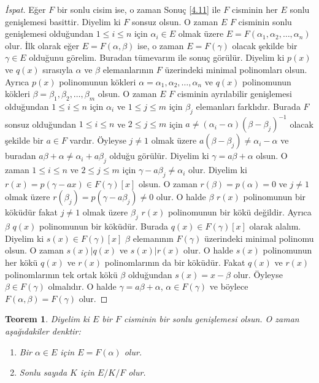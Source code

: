 \documentclass{article}
\newtheorem{thm}{Teorem}[section]
\theoremstyle{definition}
\theoremstyle{remark}
\begin{document}
    	    \begin{proof}[İspat]
    	        Eğer $F$ bir sonlu cisim ise, o zaman Sonuç \ref{4.11} ile $F$ cisminin her $E$ sonlu genişlemesi basittir. Diyelim ki $F$ sonsuz olsun. O zaman $E$ $F$ cisminin sonlu genişlemesi olduğundan $1 \leq i \leq n$ için $\alpha_i \in E$ olmak üzere $E = F(\alpha_1, \alpha_2, \dots, \alpha_n)$ olur. İlk olarak eğer $E = F(\alpha, \beta)$ ise, o zaman $E = F(\gamma)$ olacak şekilde bir $\gamma \in E$ olduğunu görelim. Buradan tümevarım ile sonuç görülür. Diyelim ki $p(x)$ ve $q(x)$ sırasıyla $\alpha$ ve $\beta$ elemanlarının $F$ üzerindeki minimal polinomları olsun. Ayrıca $p(x)$ polinomunun kökleri $\alpha = \alpha_1, \alpha_2, \dots, \alpha_n$ ve $q(x)$ polinomunun kökleri $\beta = \beta_1, \beta_2, \dots, \beta_m$ olsun. O zaman $E$ $F$ cisminin ayrılabilir genişlemesi olduğundan $1 \leq i \leq n$ için $\alpha_i$ ve $1 \leq j \leq m$ için $\beta_j$ elemanları farklıdır. Burada $F$ sonsuz olduğundan $1 \leq i \leq n$ ve $2 \leq j \leq m$ için $a \neq (\alpha_i - \alpha)(\beta - \beta_j)^{-1}$ olacak şekilde bir $a \in F$ vardır. Öyleyse $j \neq 1$ olmak üzere $a(\beta - \beta_j) \neq \alpha_i - \alpha$ ve buradan $a\beta + \alpha \neq \alpha_i + a\beta_j$ olduğu görülür. Diyelim ki $\gamma = a\beta + \alpha$ olsun. O zaman $1 \leq i \leq n$ ve $2 \leq j \leq m$ için $\gamma - a\beta_j \neq \alpha_i$ olur. Diyelim ki $r(x) = p(\gamma - ax) \in F(\gamma)[x]$ olsun. O zaman $r(\beta) = p(\alpha) = 0$ ve $j \neq 1$ olmak üzere $r(\beta_j) = p(\gamma - a\beta_j) \neq 0$ olur. O halde $\beta$ $r(x)$ polinomunun bir köküdür fakat $j \neq 1$ olmak üzere $\beta_j$ $r(x)$ polinomunun bir kökü değildir. Ayrıca $\beta$ $q(x)$ polinomunun bir köküdür. Burada $q(x) \in F(\gamma)[x]$ olarak alalım. Diyelim ki $s(x) \in F(\gamma)[x]$ $\beta$ elemanının $F(\gamma)$ üzerindeki minimal polinomu olsun. O zaman $s(x) | q(x)$ ve $s(x) | r(x)$ olur. O halde $s(x)$ polinomunun her kökü $q(x)$ ve $r(x)$ polinomlarının da bir köküdür. Fakat $q(x)$ ve $r(x)$ polinomlarının tek ortak kökü $\beta$ olduğundan $s(x) = x - \beta$ olur. Öyleyse $\beta \in F(\gamma)$ olmalıdır. O halde $\gamma = a\beta + \alpha$, $\alpha \in F(\gamma)$ ve böylece $F(\alpha, \beta) = F(\gamma)$ olur.
    	    \end{proof}
    	    
    	    \begin{thm}\label{4.14}
    	        Diyelim ki $E$ bir $F$ cisminin bir sonlu genişlemesi olsun. O zaman aşağıdakiler denktir:
    	         \begin{enumerate}
				\renewcommand{\labelenumi}{(\roman{enumi})}
				    \item Bir $\alpha \in E$ için $E = F(\alpha)$ olur.
				    \item Sonlu sayıda $K$ için $E/K/F$ olur.
				\end{enumerate}
    	    \end{thm}
    	    
\end{document}
